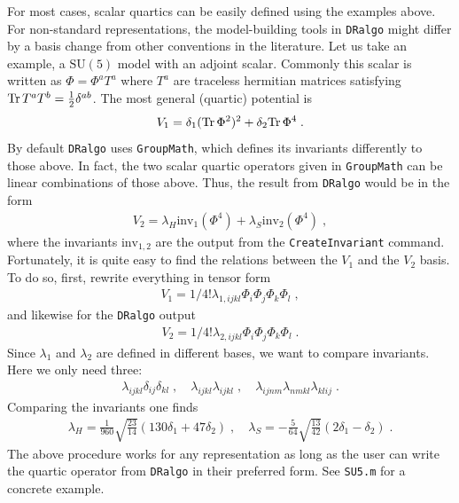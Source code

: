 \documentclass[11pt]{article}
\def\dralgo{{\tt DRalgo}}
\renewcommand{\tr}{{\rm Tr\,}}
\begin{document}
For most cases, scalar quartics can be easily defined using the examples above.
For non-standard representations,
the model-building tools in \dralgo{} might differ by
a basis change from other conventions in the literature.
Let us take an example,
a $\mathrm{SU}(5)$ model with an adjoint scalar.
Commonly this scalar is written as
$\Phi=\Phi^a T^a$ where
$T^a$ are traceless hermitian matrices satisfying
$\tr T^a T^b=\frac{1}{2}\delta^{ab}$.
The most general (quartic) potential is
\begin{align}
  V_1=
      \delta_1 (\tr\Phi^2)^2
    + \delta_2  \tr\Phi^4
    \;.
\end{align}
By default \dralgo{} uses {\tt GroupMath}, which defines its invariants differently to those above.
In fact,
the two scalar quartic operators given in {\tt GroupMath} can be
linear combinations of those above.
Thus,
the result from \dralgo{} would be in the form
\begin{align}
  V_2=
    \lambda_H \text{inv}_1^{ }(\Phi^4)
  + \lambda_S \text{inv}_2^{ }(\Phi^4)
  \;,
\end{align}
where
the invariants
$\text{inv}_{1,2}$ are the output from the {\tt CreateInvariant} command.
Fortunately,
it is quite easy to find the relations between the $V_1$ and the $V_2$ basis.
To do so, first, rewrite everything in tensor form
\begin{align}
V_1=1/4! \lambda_{1,ijkl}^{ }\Phi_i^{ } \Phi_j^{ } \Phi_k^{ } \Phi_l^{ }
  \;,
\end{align}
and likewise for the \dralgo{} output
\begin{align}
V_2=1/4! \lambda_{2,ijkl}^{ }\Phi_i^{ } \Phi_j^{ } \Phi_k^{ } \Phi_l^{ }
  \;.
\end{align}
Since
$\lambda_1$ and
$\lambda_2$ are defined in different bases,
we want to compare invariants.
Here we only need three:
\begin{align}
 \lambda_{ijkl}\delta_{ij} \delta_{kl}
  \;,\quad
 \lambda_{ijkl}\lambda_{ijkl}
  \;,\quad
 \lambda_{ijnm}\lambda_{nmkl}\lambda_{kl ij}
  \;.
\end{align}
Comparing the invariants one finds
\begin{align}
  \lambda_H=\frac{1}{960} \sqrt{\frac{23}{14}} (130 \delta_1+47 \delta_2)
  \;,\quad 
  \lambda_S=-\frac{5}{64} \sqrt{\frac{13}{42}} (2\delta_1-\delta_2)
  \;.
\end{align}
The above procedure works for any representation as long as
the user can write the quartic operator from \dralgo{} in their preferred form.
See {\tt SU5.m} for a concrete example.
\end{document}
